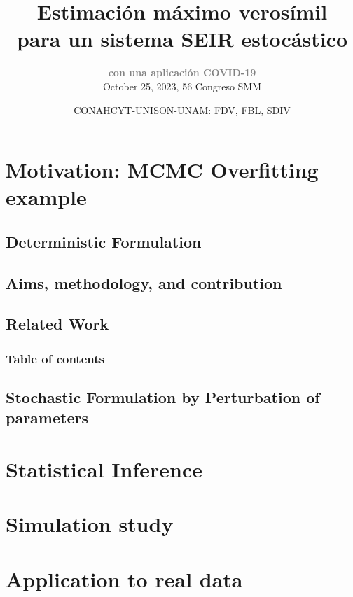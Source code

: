 \documentclass[9pt]{beamer}
\title{\Huge{Estimaci\'{o}n m\'{a}ximo veros\'{i}mil }\\
    \Huge{
        \textbf{
        para un sistema SEIR estoc\'{a}stico
        }
    }
}
\subtitle{%
        \textbf{
            \textcolor{gray}{
                 con una aplicaci\'{o}n COVID-19%
            }
       }
    \\
    \normalsize{October 25, 2023, 56 Congreso SMM }
    }
\author{
    \normalsize{%
        CONAHCYT-UNISON-UNAM: FDV, FBL, SDIV
    }
}
\begin{document}
    \titlepage  
        \section{Motivation: MCMC Overfitting example}
            \subsection{Deterministic Formulation}
            
        \subsection{Aims, methodology, and contribution}
            
                \subsection{Related Work}
            
                \begin{frame}
                   \frametitle{Table of contents}
                   \tableofcontents
                \end{frame}
            \subsection{
                Stochastic Formulation by Perturbation of parameters
            }
                
            \section{Statistical Inference}
                
            \section{Simulation study}
                
    \section{Application to real data}
            
\end{document}
